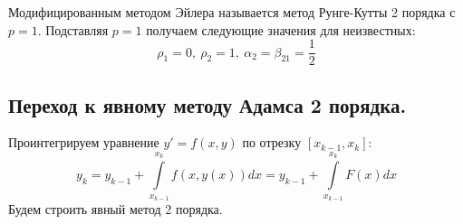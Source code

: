 \documentclass[a4paper, 12pt]{article}
\theoremstyle{mythm}
\begin{document}
	Модифицированным методом Эйлера называется метод Рунге-Кутты 2 порядка с $p=1$. Подставляя $p=1$ получаем следующие значения для неизвестных:
	\begin{equation}
		\rho_1=0,\ \rho_2=1,\ \alpha_2=\beta_{21}=\dfrac{1}{2}
	\end{equation}

	\subsection{Переход к явному методу Адамса 2 порядка.}
	
	Проинтегрируем уравнение $y'=f(x,y)$ по отрезку $[x_{k-1}, x_k]$:
	\begin{equation} \label{int_adams}
		y_k=y_{k-1}+\int\limits_{x_{k-1}}^{x_k}f(x,y(x))dx=y_{k-1}+\int\limits_{x_{k-1}}^{x_k}F(x)dx
	\end{equation}
	Будем строить явный метод 2 порядка.
	
\end{document}
